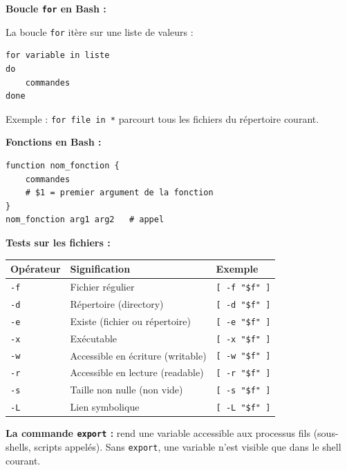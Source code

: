 \documentclass[a4paper,11pt]{article}
\theoremstyle{plain}
\theoremstyle{definition}
\begin{document}
\begin{rappel}
\textbf{Boucle \texttt{for} en Bash :}

La boucle \texttt{for} itère sur une liste de valeurs :
\begin{lstlisting}[numbers=none]
for variable in liste
do
    commandes
done
\end{lstlisting}
Exemple : \texttt{for file in *} parcourt tous les fichiers du répertoire courant.

\medskip
\textbf{Fonctions en Bash :}
\begin{lstlisting}[numbers=none]
function nom_fonction {
    commandes
    # $1 = premier argument de la fonction
}
nom_fonction arg1 arg2   # appel
\end{lstlisting}

\medskip
\textbf{Tests sur les fichiers :}

\begin{center}
\begin{tabular}{lll}
\toprule
\textbf{Opérateur} & \textbf{Signification} & \textbf{Exemple} \\
\midrule
\texttt{-f} & Fichier régulier & \texttt{[ -f "\$f" ]} \\
\texttt{-d} & Répertoire (directory) & \texttt{[ -d "\$f" ]} \\
\texttt{-e} & Existe (fichier ou répertoire) & \texttt{[ -e "\$f" ]} \\
\texttt{-x} & Exécutable & \texttt{[ -x "\$f" ]} \\
\texttt{-w} & Accessible en écriture (writable) & \texttt{[ -w "\$f" ]} \\
\texttt{-r} & Accessible en lecture (readable) & \texttt{[ -r "\$f" ]} \\
\texttt{-s} & Taille non nulle (non vide) & \texttt{[ -s "\$f" ]} \\
\texttt{-L} & Lien symbolique & \texttt{[ -L "\$f" ]} \\
\bottomrule
\end{tabular}
\end{center}

\medskip
\textbf{La commande \texttt{export} :} rend une variable accessible aux processus fils (sous-shells, scripts appelés). Sans \texttt{export}, une variable n'est visible que dans le shell courant.
\end{rappel}
\end{document}
